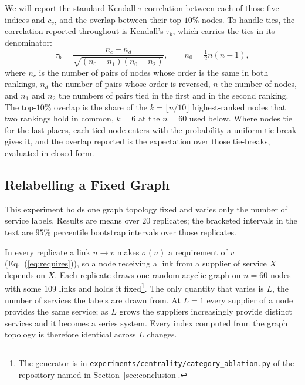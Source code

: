 \documentclass{svproc}
\begin{document}
We will report the standard Kendall $\tau$ correlation between each of those five indices
and $c_v$, and the overlap between their top $10\%$ nodes. To handle ties, the correlation reported throughout is
Kendall's $\tau_b$, which carries the ties in its denominator:
\begin{equation}
\tau_b = \frac{n_c - n_d}{\sqrt{(n_0 - n_1)(n_0 - n_2)}},
\qquad n_0 = \tfrac{1}{2} n(n-1),
\end{equation}
where $n_c$ is the number of pairs of nodes whose order is the same in both
rankings, $n_d$ the number of pairs whose order is reversed, $n$ the number of
nodes, and $n_1$ and $n_2$ the numbers of pairs tied in the first and in the second
ranking.
The top-$10\%$ overlap is the share of the $k = \lfloor n/10 \rfloor$ highest-ranked
nodes that two rankings hold in common, $k = 6$ at the $n = 60$ used below. Where
nodes tie for the last places, each tied node enters with the probability a uniform
tie-break gives it, and the overlap reported is the expectation over those
tie-breaks, evaluated in closed form.

\subsection{Relabelling a Fixed Graph}
\label{sec:ablation}
This experiment holds one graph topology fixed and varies only the number of service labels.
Results are means over $20$ replicates; the bracketed intervals in the text are $95\%$ percentile
bootstrap intervals over those replicates.

In every replicate a link $u \to v$ makes $\sigma(u)$ a requirement of $v$ (Eq.~(\ref{eq:requires})),
so a node receiving a link from a supplier of service $X$ depends on $X$.
Each replicate draws one random acyclic graph on $n = 60$ nodes with some $109$
links and holds it fixed\footnote{The generator is in
\texttt{experiments/centrality/category\_ablation.py} of the repository named in
Section~\ref{sec:conclusion}.}. The only quantity that varies is $L$, the number
of services the labels are drawn from. At $L=1$ every supplier of a node provides
the same service; as $L$ grows the suppliers
increasingly provide distinct services and it becomes a series system. Every
index computed from the graph topology is therefore identical across $L$ changes. 
\end{document}
